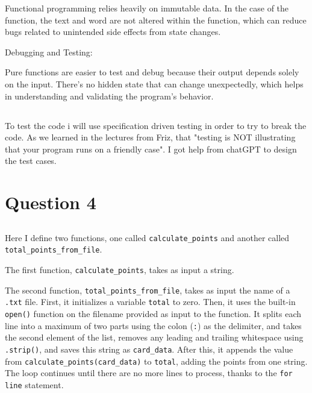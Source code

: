 \documentclass{article}
\begin{document}
Functional programming relies heavily on immutable data. In the case of the function, the text and word are not altered within the function, which can reduce bugs related to unintended side effects from state changes.

Debugging and Testing:

Pure functions are easier to test and debug because their output depends solely on the input. There’s no hidden state that can change unexpectedly, which helps in understanding and validating the program's behavior.


\subsection{}

To test the code i will use specification driven testing in order to try to break the code. As we learned in the lectures from Friz, that "testing is NOT illustrating that your program runs on a friendly case". I got help from chatGPT to design the test cases.





\section{Question 4}
\subsection{}


Here I define two functions, one called \texttt{calculate\_points} and another called \texttt{total\_points\_from\_file}.

The first function, \texttt{calculate\_points}, takes as input a string.

The second function, \texttt{total\_points\_from\_file}, takes as input the name of a \texttt{.txt} file. First, it initializes a variable \texttt{total} to zero. Then, it uses the built-in \texttt{open()} function on the filename provided as input to the function. It splits each line into a maximum of two parts using the colon (\texttt{:}) as the delimiter, and takes the second element of the list, removes any leading and trailing whitespace using \texttt{.strip()}, and saves this string as \texttt{card\_data}. After this, it appends the value from \texttt{calculate\_points(card\_data)} to \texttt{total}, adding the points from one string. The loop continues until there are no more lines to process, thanks to the \texttt{for line} statement.
\end{document}
